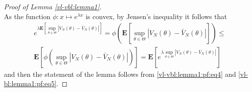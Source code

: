 \documentclass{article}
\newcommand{\y}{\mathbf{y}}
\newcommand{\bE}{\mathbf{E}}
\begin{document}
\begin{proof}[Proof of Lemma \ref{vl-vbl:lemma1}]
\begin{equation}
\end{equation}
As the function 
$\phi:x \mapsto e^{\lambda x}$ is convex, by Jensen's inequality it follows that 
\begin{align*}
& e^{\lambda \bE[\sup_{\theta \in \Theta} |V_N(\theta) - \bar{V}_N(\theta)|]}=
\phi(\bE[\sup_{\theta \in \Theta} |V_N(\theta) - \bar{V}_N(\theta)|]) \le \\
&  \bE[\phi(\sup_{\theta \in \Theta} |V_N(\theta) - \bar{V}_N(\theta)|)]
   = \bE[e^{\lambda \sup_{\theta \in \Theta} |V_N(\theta) - \bar{V}_N(\theta)|}]
\end{align*}
and then the statement of the lemma follows from 
\eqref{vl-vbl:lemma1:pf:eq4} and \eqref{vl-bl:lemma1:pf:eq5}.
\end{proof}
\end{document}
